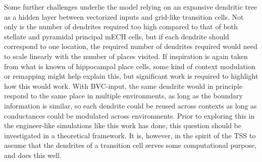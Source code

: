 \documentclass{article}
\begin{document}
    Some further challenges underlie the model relying on an expansive dendritic tree as a hidden layer between vectorized inputs and grid-like transition cells. Not only is the number of dendrites required too high compared to that of both stellate and pyramidal principal mECII cells, but if each dendrite should correspond to one location, the required number of dendrites required would need to scale linearly with the number of places visited. If inspiration is again taken from what is known of hippocampal place cells, some kind of context modulation or remapping might help explain this, but significant work is required to highlight how this would work. With BVC-input, the same dendrite would in principle respond to the same place in multiple environments, as long as the boundary information is similar, so each dendrite could be reused across contexts as long as conductances could be modulated across environments. Prior to exploring this in the engineer-like simulations like this work has done, this question should be investigated in a theoretical framework.
    It is, however, in the spirit of the TSS to assume that the dendrites of a transition cell serves some computational purpose, and does this well.




    \printbibliography
\end{document}
